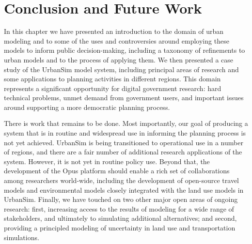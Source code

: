 
\section{Conclusion and Future Work}

In this chapter we have presented an introduction to the domain of urban
modeling and to some of the uses and controversies around employing these
models to inform public decision-making, including a taxonomy of refinements
to urban models and to the process of applying them.  We then presented a
case study of the UrbanSim model system, including principal areas of
research and some applications to planning activities in different regions.
This domain represents a significant opportunity for digital government
research: hard technical problems, unmet demand from government users, and
important issues around supporting a more democratic planning process.

There is work that remains to be done.  Most importantly, our goal
of producing a system that is in routine and widespread use in
informing the planning process is not yet achieved.  UrbanSim is
being transitioned to operational use in a number of regions, and
there are a fair number of additional research applications of the
system.  However, it is not yet in routine policy use.  Beyond that,
the development of the Opus platform should enable a rich set of
collaborations among researchers world-wide, including the
development of open-source travel models and environmental models
closely integrated with the land use models in UrbanSim.  Finally,
we have touched on two other major open areas of ongoing research:
first, increasing access to the results of modeling for a wide range
of stakeholders, and ultimately to simulating additional
alternatives; and second, providing a principled modeling of
uncertainty in land use and transportation simulations.

